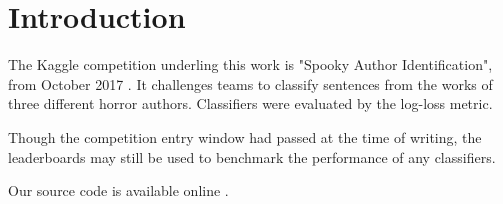 \section{Introduction}
\label{sec:intro}
The Kaggle competition underling this work is "Spooky Author Identification", from October 2017 \cite{kaggle}. It challenges teams to classify sentences from the works of three
different horror authors. Classifiers were evaluated by the log-loss metric.

Though the competition entry window had passed at the time of writing, the leaderboards may still be used to benchmark the performance of any classifiers.

Our source code is available online \cite{source-code}.
